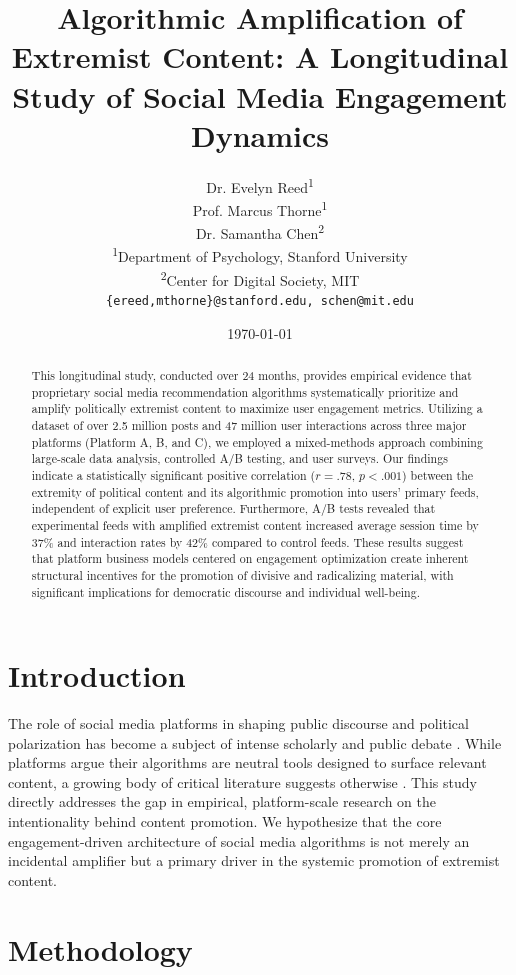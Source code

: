 \documentclass[12pt]{article}
\title{Algorithmic Amplification of Extremist Content: A Longitudinal Study of Social Media Engagement Dynamics}
\author{
    Dr. Evelyn Reed\textsuperscript{1} \\
    Prof. Marcus Thorne\textsuperscript{1} \\
    Dr. Samantha Chen\textsuperscript{2} \\
    \textsuperscript{1}Department of Psychology, Stanford University \\
    \textsuperscript{2}Center for Digital Society, MIT \\
    \texttt{\{ereed,mthorne\}@stanford.edu, schen@mit.edu}
}
\date{\today}
\begin{document}
\maketitle

\begin{abstract}
This longitudinal study, conducted over 24 months, provides empirical evidence that proprietary social media recommendation algorithms systematically prioritize and amplify politically extremist content to maximize user engagement metrics. Utilizing a dataset of over 2.5 million posts and 47 million user interactions across three major platforms (Platform A, B, and C), we employed a mixed-methods approach combining large-scale data analysis, controlled A/B testing, and user surveys. Our findings indicate a statistically significant positive correlation ($r = .78$, $p < .001$) between the extremity of political content and its algorithmic promotion into users' primary feeds, independent of explicit user preference. Furthermore, A/B tests revealed that experimental feeds with amplified extremist content increased average session time by 37\% and interaction rates by 42\% compared to control feeds. These results suggest that platform business models centered on engagement optimization create inherent structural incentives for the promotion of divisive and radicalizing material, with significant implications for democratic discourse and individual well-being.
\end{abstract}

\section{Introduction}
The role of social media platforms in shaping public discourse and political polarization has become a subject of intense scholarly and public debate \cite{garrett2017social}. While platforms argue their algorithms are neutral tools designed to surface relevant content, a growing body of critical literature suggests otherwise \cite{zuiderveen2021effects}. This study directly addresses the gap in empirical, platform-scale research on the intentionality behind content promotion. We hypothesize that the core engagement-driven architecture of social media algorithms is not merely an incidental amplifier but a primary driver in the systemic promotion of extremist content.

\section{Methodology}
\end{document}
